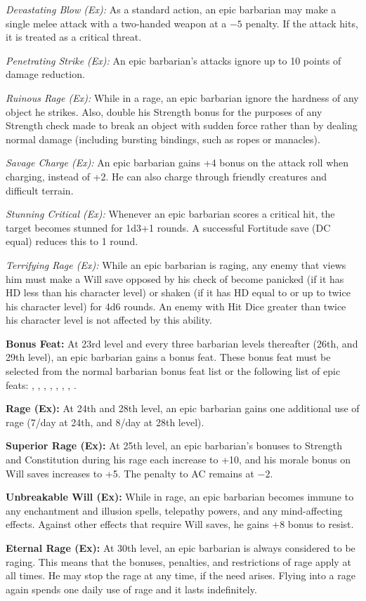 \textit{Devastating Blow (Ex):} As a standard action, an epic barbarian may make a single melee attack with a two-handed weapon at a $-5$ penalty. If the attack hits, it is treated as a critical threat.

\textit{Penetrating Strike (Ex):} An epic barbarian's attacks ignore up to 10 points of damage reduction.

\textit{Ruinous Rage (Ex):} While in a rage, an epic barbarian ignore the hardness of any object he strikes. Also, double his Strength bonus for the purposes of any Strength check made to break an object with sudden force rather than by dealing normal damage (including bursting bindings, such as ropes or manacles).

\textit{Savage Charge (Ex):} An epic barbarian gains +4 bonus on the attack roll when charging, instead of +2. He can also charge through friendly creatures and difficult terrain.

\textit{Stunning Critical (Ex):} Whenever an epic barbarian scores a critical hit, the target becomes stunned for 1d3+1 rounds. A successful Fortitude save (DC equal) reduces this to 1 round.

\textit{Terrifying Rage (Ex):} While an epic barbarian is raging, any enemy that views him must make a Will save opposed by his  check of become panicked (if it has HD less than his character level) or shaken (if it has HD equal to or up to twice his character level) for 4d6 rounds. An enemy with Hit Dice greater than twice his character level is not affected by this ability.


\textbf{Bonus Feat:} At 23rd level and every three barbarian levels thereafter (26th, and 29th level), an epic barbarian gains a bonus feat. These bonus feat must be selected from the normal barbarian bonus feat list or the following list of epic feats:
,
,
,
,
,
,
,
.

\textbf{Rage (Ex):} At 24th and 28th level, an epic barbarian gains one additional use of rage (7/day at 24th, and 8/day at 28th level).

\textbf{Superior Rage (Ex):} At 25th level, an epic barbarian's bonuses to Strength and Constitution during his rage each increase to +10, and his morale bonus on Will saves increases to +5. The penalty to AC remains at $-2$.

\textbf{Unbreakable Will (Ex):} While in rage, an epic barbarian becomes immune to any enchantment and illusion spells, telepathy powers, and any mind-affecting effects. Against other effects that require Will saves, he gains +8 bonus to resist.

\textbf{Eternal Rage (Ex):} At 30th level, an epic barbarian is always considered to be raging. This means that the bonuses, penalties, and restrictions of rage apply at all times. He may stop the rage at any time, if the need arises. Flying into a rage again spends one daily use of rage and it lasts indefinitely.
